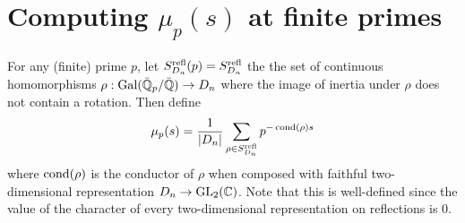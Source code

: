 \section{Computing $\mu_p(s)$ at finite primes}\label{sec:finiteprimes}

For any (finite) prime $p$, let $S_{D_n}^{\mathrm{refl}}(p) = S_{D_n}^{\mathrm{refl}}$ the the set of continuous homomorphisms
$\rho : \operatorname{Gal}(\Bar{\mathbb{Q}}_p/\Bar{\mathbb{Q}}) \to D_n$ where the image of inertia under $\rho$ does not contain a rotation. Then define
\[ \mu_p(s) = \frac{1}{|D_n|} \sum_{\rho \in S_{D_n}^{\mathrm{refl}}} p^{-\operatorname{cond}(\rho)s} \]
where $\operatorname{cond}(\rho)$ is the conductor of $\rho$ when composed with faithful
two-dimensional representation $D_n \to \operatorname{GL}_2(\mathbb{C})$. Note that this is
well-defined since the value of the character of every two-dimensional representation on reflections is $0$.

